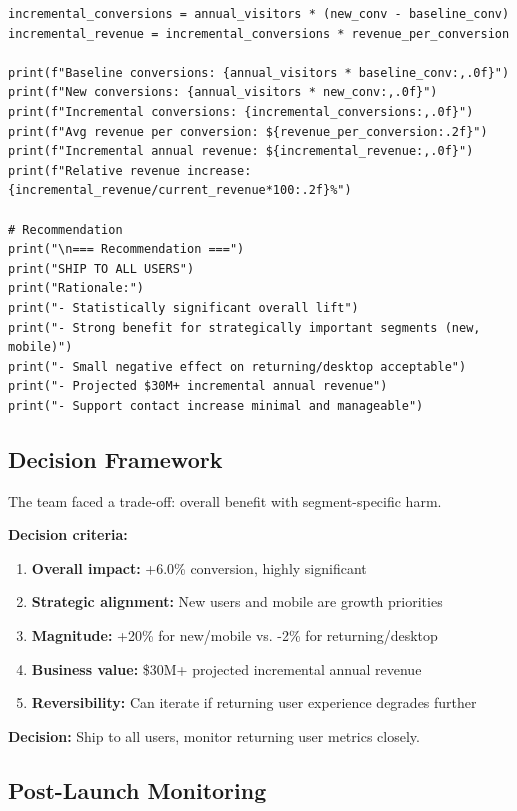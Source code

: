 \begin{lstlisting}
incremental_conversions = annual_visitors * (new_conv - baseline_conv)
incremental_revenue = incremental_conversions * revenue_per_conversion

print(f"Baseline conversions: {annual_visitors * baseline_conv:,.0f}")
print(f"New conversions: {annual_visitors * new_conv:,.0f}")
print(f"Incremental conversions: {incremental_conversions:,.0f}")
print(f"Avg revenue per conversion: ${revenue_per_conversion:.2f}")
print(f"Incremental annual revenue: ${incremental_revenue:,.0f}")
print(f"Relative revenue increase: {incremental_revenue/current_revenue*100:.2f}%")

# Recommendation
print("\n=== Recommendation ===")
print("SHIP TO ALL USERS")
print("Rationale:")
print("- Statistically significant overall lift")
print("- Strong benefit for strategically important segments (new, mobile)")
print("- Small negative effect on returning/desktop acceptable")
print("- Projected $30M+ incremental annual revenue")
print("- Support contact increase minimal and manageable")
\end{lstlisting}

\subsection{Decision Framework}

The team faced a trade-off: overall benefit with segment-specific harm.

\textbf{Decision criteria:}
\begin{enumerate}
    \item \textbf{Overall impact:} +6.0\% conversion, highly significant
    \item \textbf{Strategic alignment:} New users and mobile are growth priorities
    \item \textbf{Magnitude:} +20\% for new/mobile vs. -2\% for returning/desktop
    \item \textbf{Business value:} \$30M+ projected incremental annual revenue
    \item \textbf{Reversibility:} Can iterate if returning user experience degrades further
\end{enumerate}

\textbf{Decision:} Ship to all users, monitor returning user metrics closely.

\subsection{Post-Launch Monitoring}

